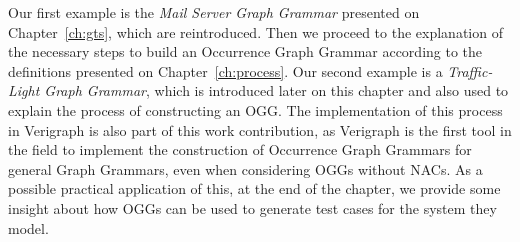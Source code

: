 
Our first example is the \emph{Mail Server Graph Grammar} presented on Chapter~\ref{ch:gts}, which are reintroduced. Then we proceed to the explanation of the necessary steps to build an Occurrence Graph Grammar according to the definitions presented on Chapter~\ref{ch:process}. Our second example is a \emph{Traffic-Light Graph Grammar}, which is introduced later on this chapter and also used to explain the process of constructing an OGG. The implementation of this process in Verigraph
is also part of this work contribution, as Verigraph is the first tool in the field to implement the construction of Occurrence Graph Grammars for general Graph Grammars, even when considering OGGs without NACs. As a possible practical application of this, at the end of the chapter, we provide some insight about how OGGs can be used to generate test cases for the system they model.



